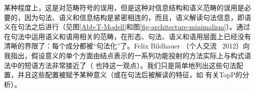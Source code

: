 %
某种程度上，这是对范畴符号的误用，但是这种对信息结构和语义范畴的误用是必要的，因为句法、语义和信息结构是紧密相连的，而且，语义解读句法信息，即语义在句法之后进行（见图\ref{Abb-T-Modell}和图\ref{fig-architecture-minimalism}）。通过在句法中运用语义和语用相关的范畴，在形态、句法、语义和语用层面上已经没有清晰的界限了：每个成分都被“句法化”了。Felix Bildhauer （个人交流 \, 2012）向我指出，假设意义的单个方面由结点表示的一系列功能投射的方法实际上与构式语法中的短语方法非常接近了（\citealp[]{Adger2013a} 也持这一观点）。我们只是简单地列出这些句法配置，并且这些配置被赋予某种意义（或在句法后被解读的特征，如 有关TopP的分析）。

